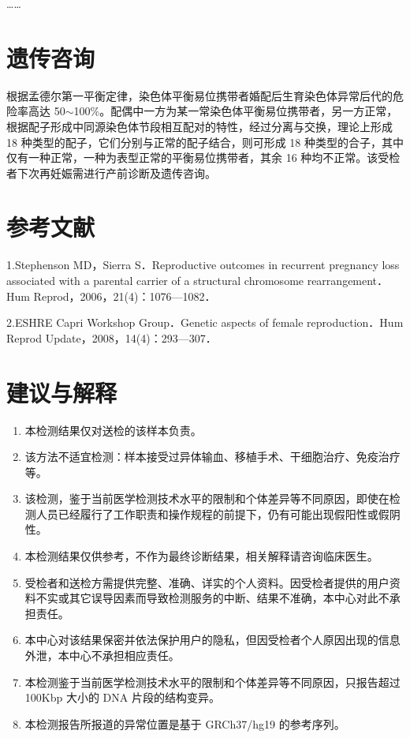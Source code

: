 \documentclass{article}
\newcommand{\headingone}[1]{{\noindent \Large \kaishu{#1}}\\}
\begin{document}
…… 

\section*{遗传咨询}


根据孟德尔第一平衡定律，染色体平衡易位携带者婚配后生育染色体异常后代的危险率高达 50$\sim$100\%。配偶中一方为某一常染色体平衡易位携带者，另一方正常，根据配子形成中同源染色体节段相互配对的特性，经过分离与交换，理论上形成 18 种类型的配子，它们分别与正常的配子结合，则可形成 18 种类型的合子，其中仅有一种正常，一种为表型正常的平衡易位携带者，其余 16 种均不正常。该受检者下次再妊娠需进行产前诊断及遗传咨询。

\section*{参考文献}

1.Stephenson MD，Sierra S．Reproductive outcomes in recurrent pregnancy loss associated with a parental carrier of a structural chromosome rearrangement．Hum Reprod，2006，21(4)：1076—1082．
 
2.ESHRE Capri Workshop Group．Genetic aspects of female reproduction．Hum Reprod Update，2008，14(4)：293—307．

\section*{建议与解释}

\begin{enumerate}
	\item 本检测结果仅对送检的该样本负责。 
	\item 该方法不适宜检测：样本接受过异体输血、移植手术、干细胞治疗、免疫治疗等。
	\item 该检测，鉴于当前医学检测技术水平的限制和个体差异等不同原因，即使在检测人员已经履行了工作职责和操作规程的前提下，仍有可能出现假阳性或假阴性。
	\item 本检测结果仅供参考，不作为最终诊断结果，相关解释请咨询临床医生。
	\item 受检者和送检方需提供完整、准确、详实的个人资料。因受检者提供的用户资料不实或其它误导因素而导致检测服务的中断、结果不准确，本中心对此不承担责任。
	\item 本中心对该结果保密并依法保护用户的隐私，但因受检者个人原因出现的信息外泄，本中心不承担相应责任。
	\item 本检测鉴于当前医学检测技术水平的限制和个体差异等不同原因，只报告超过 100Kbp 大小的 DNA 片段的结构变异。
	\item 本检测报告所报道的异常位置是基于 GRCh37/hg19 的参考序列。
\end{enumerate}
\end{document}
